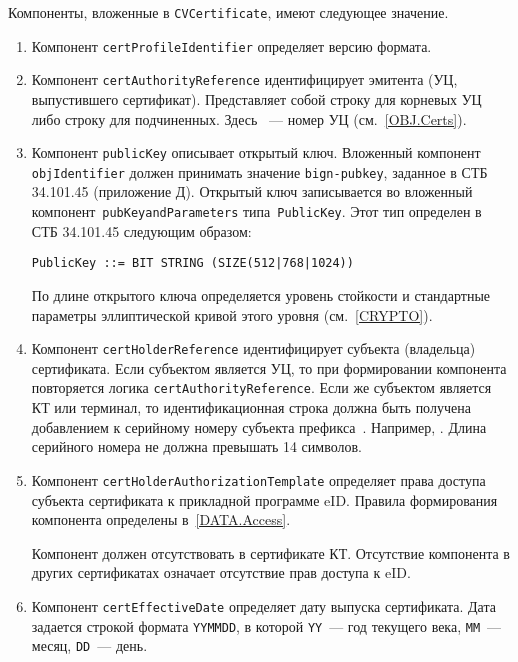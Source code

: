 Компоненты, вложенные в \verb|CVCertificate|, имеют следующее значение.
\begin{enumerate}
\item
Компонент \verb|certProfileIdentifier| определяет версию формата. 

\item
Компонент \verb|certAuthorityReference| идентифицирует эмитента 
(УЦ, выпустившего сертификат). 
Представляет собой строку  для корневых УЦ либо  
строку  для подчиненных. Здесь ~--- 
номер УЦ (см.~\ref{OBJ.Certs}).

\item
Компонент \verb|publicKey| описывает открытый ключ.
%
Вложенный компонент \verb|objIdentifier| 
должен принимать значение \texttt{bign-pubkey}, 
заданное в СТБ 34.101.45 (приложение Д).
%
Открытый ключ записывается во вложенный компонент~\verb|pubKeyandParameters| 
типа~\verb|PublicKey|. Этот тип определен в СТБ 34.101.45 следующим образом: 
\begin{verbatim} 
PublicKey ::= BIT STRING (SIZE(512|768|1024))
\end{verbatim} 

По длине открытого ключа определяется уровень стойкости и стандартные параметры  
эллиптической кривой этого уровня (см.~\ref{CRYPTO}).

\item
Компонент \verb|certHolderReference| идентифицирует субъекта (владельца) 
сертификата. Если субъектом является УЦ, то при формировании компонента 
повторяется логика \verb|certAuthorityReference|. Если же субъектом является КТ 
или терминал, то идентификационная строка должна быть получена добавлением к 
серийному номеру субъекта префикса~. Например, . 
Длина серийного номера не должна превышать 14 символов.

\item
Компонент \verb|certHolderAuthorizationTemplate| определяет права доступа 
субъекта сертификата к прикладной программе eID. Правила формирования 
компонента определены в~\ref{DATA.Access}.

Компонент должен отсутствовать в сертификате КТ.
%
Отсутствие компонента в других сертификатах означает отсутствие прав 
доступа к eID. 

\item
Компонент \verb|certEffectiveDate| определяет дату выпуска сертификата.
%
Дата задается строкой формата \texttt{YYMMDD}, 
в которой \texttt{YY}~--- год текущего века, 
\texttt{MM}~--- месяц, \texttt{DD}~--- день.


\end{enumerate}
